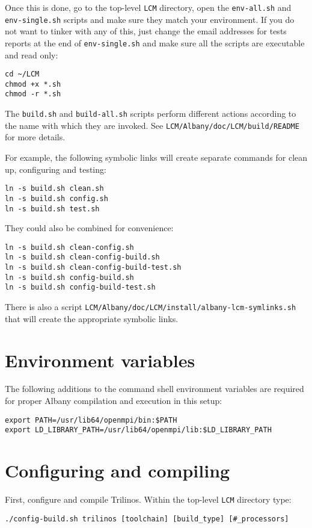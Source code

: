 \documentclass[10pt,a4paper]{article} \usepackage[utf8]{inputenc}
\begin{document}
Once this is done, go to the top-level \verb+LCM+ directory, open the
\verb+env-all.sh+ and \verb+env-single.sh+ scripts and make sure they
match your environment. If you do not want to tinker with any of this,
just change the email addresses for tests reports at the end of
\verb+env-single.sh+ and make sure all the scripts are executable and
read only:
\begin{verbatim}
cd ~/LCM
chmod +x *.sh
chmod -r *.sh
\end{verbatim}

The \verb+build.sh+ and \verb+build-all.sh+ scripts perform different
actions according to the name with which they are invoked. See
\verb+LCM/Albany/doc/LCM/build/README+ for more details. 

For example, the following symbolic links will create separate
commands for clean up, configuring and testing:
\begin{verbatim}
ln -s build.sh clean.sh
ln -s build.sh config.sh
ln -s build.sh test.sh
\end{verbatim}
They could also be combined for convenience:
\begin{verbatim}
ln -s build.sh clean-config.sh
ln -s build.sh clean-config-build.sh
ln -s build.sh clean-config-build-test.sh
ln -s build.sh config-build.sh
ln -s build.sh config-build-test.sh
\end{verbatim}
There is also a script
\verb+LCM/Albany/doc/LCM/install/albany-lcm-symlinks.sh+
that will create the appropriate symbolic links. 

\section{Environment variables}
The following additions to the command shell environment variables are
required for proper Albany compilation and execution in this setup:
\begin{verbatim}
export PATH=/usr/lib64/openmpi/bin:$PATH
export LD_LIBRARY_PATH=/usr/lib64/openmpi/lib:$LD_LIBRARY_PATH
\end{verbatim}

\section{Configuring and compiling}
First, configure and compile Trilinos. Within the top-level \verb+LCM+
directory type:
\begin{verbatim}
./config-build.sh trilinos [toolchain] [build_type] [#_processors]
\end{verbatim}
\end{document}
